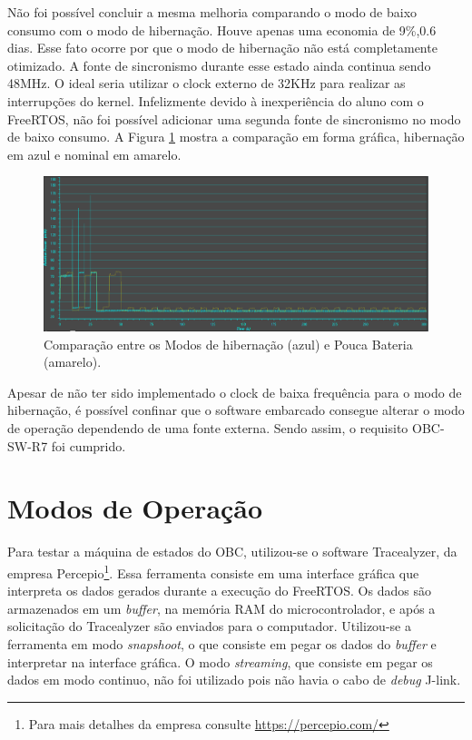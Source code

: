 \newpage
Não foi possível concluir a mesma melhoria comparando o modo de baixo consumo com o modo de hibernação. Houve apenas uma economia de 9\%,0.6 dias. Esse fato ocorre por que o modo de hibernação não está completamente otimizado. A fonte de sincronismo durante esse estado ainda continua sendo 48MHz. O ideal seria utilizar o clock externo de 32KHz para realizar as interrupções do kernel. Infelizmente devido à inexperiência do aluno com o FreeRTOS, não foi possível adicionar uma segunda fonte de sincronismo no modo de baixo consumo. A Figura \ref{hibernatexLBM} mostra a comparação em forma gráfica, hibernação em azul e nominal em amarelo.
\newline
\begin{figure}[h]
	\centering
	\caption{Comparação entre os Modos de hibernação (azul) e Pouca Bateria (amarelo).}
	\includegraphics[keepaspectratio=true,scale=0.470]{figuras/hibernatexLBM.PNG}
	
	\label{hibernatexLBM}
\end{figure}

Apesar de não ter sido implementado o clock de baixa frequência para o modo de hibernação, é possível confinar que o software embarcado consegue alterar o modo de operação dependendo de uma fonte externa. Sendo assim, o requisito OBC-SW-R7 foi cumprido.

\section{Modos de Operação}


Para testar a máquina de estados do OBC, utilizou-se o software Tracealyzer, da empresa Percepio\footnote{Para mais detalhes da empresa consulte \url{https://percepio.com/}}. Essa ferramenta consiste em uma interface gráfica que interpreta os dados gerados durante a execução do FreeRTOS. Os dados são armazenados em um \textit{buffer}, na memória RAM do microcontrolador, e após a solicitação do Tracealyzer são enviados para o computador. Utilizou-se a ferramenta em modo \textit{snapshoot}, o que consiste em pegar os dados do \textit{buffer} e interpretar na interface gráfica. O modo \textit{streaming}, que consiste em pegar os dados em modo continuo, não foi utilizado pois não havia o cabo de \textit{debug} J-link.

